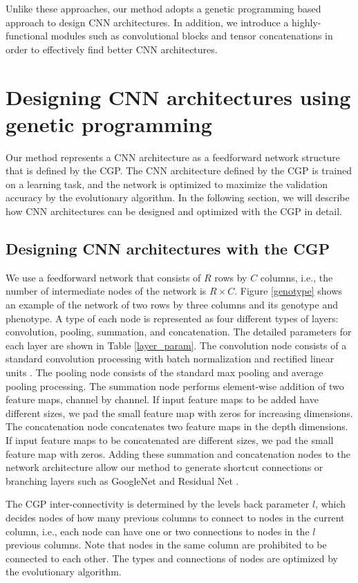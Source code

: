 Unlike these approaches, our method adopts a genetic programming based approach to design CNN architectures.
In addition, we introduce a highly-functional modules such as convolutional blocks and tensor concatenations in order to effectively find better CNN architectures.

\section{Designing CNN architectures using genetic programming}
Our method represents a CNN architecture as a feedforward network structure that is defined by the CGP.
The CNN architecture defined by the CGP is trained on a learning task, and the network is optimized to maximize the validation accuracy by the evolutionary algorithm.
In the following section, we will describe how CNN architectures can be designed and optimized with the CGP in detail.

\subsection{Designing CNN architectures with the CGP}
We use a feedforward network that consists of $R$ rows by $C$ columns, i.e., the number of intermediate nodes of the network is $R\times C$.
Figure \ref{genotype} shows an example of the network of two rows by three columns and its genotype and phenotype.
A type of each node is represented as four different types of layers: convolution, pooling, summation, and concatenation.
The detailed parameters for each layer are shown in Table \ref{layer_param}.
The convolution node consists of a standard convolution processing with batch normalization \cite{ioffe_batch_2015} and rectified linear units \cite{nair_rectified_2010}.
The pooling node consists of the standard max pooling and average pooling processing.
The summation node performs element-wise addition of two feature maps, channel by channel. 
If input feature maps to be added have different sizes, we pad the small feature map with zeros for increasing dimensions.
The concatenation node concatenates two feature maps in the depth dimensions.
If input feature maps to be concatenated are different sizes, we pad the small feature map with zeros.
Adding these summation and concatenation nodes to the network architecture allow our method to generate shortcut connections or branching layers such as GoogleNet \cite{szegedy_going_2015} and Residual Net \cite{he_deep_2016}.

The CGP inter-connectivity is determined by the levels back parameter $l$, which decides nodes of how many previous columns to connect to nodes in the current column, i.e., each node can have one or two connections to nodes in the $l$ previous columns.
Note that nodes in the same column are prohibited to be connected to each other.
The types and connections of nodes are optimized by the evolutionary algorithm.

